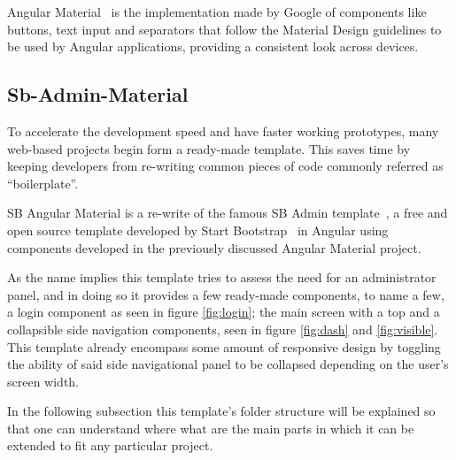 Angular Material~\cite{angularmaterial} is the implementation made by Google of components like buttons, text input and separators that follow the Material Design guidelines to be used by Angular applications, providing a consistent look across devices.

\subsection{Sb-Admin-Material}
To accelerate the development speed and have faster working prototypes, many web-based projects begin form a ready-made template. This saves time by keeping developers from re-writing common pieces of code commonly referred as ``boilerplate''.

SB Angular Material is a re-write of the famous SB Admin template~\cite{angulartemplate}, a free and open source template developed by Start Bootstrap~\cite{sbadmin} in Angular using components developed in the previously discussed Angular Material project.

As the name implies this template tries to assess the need for an administrator panel, and in doing so it provides a few ready-made components, to name a few, a login component as seen in figure \ref{fig:login}; the main screen with a top and a collapsible side navigation components, seen in figure \ref{fig:dash} and \ref{fig:visible}. This template already encompass some amount of responsive design by toggling the ability of said side navigational panel to be collapsed depending on the user's screen width.

In the following subsection this template's folder structure will be explained so that one can understand where what are the main parts in which it can be extended to fit any particular project.


